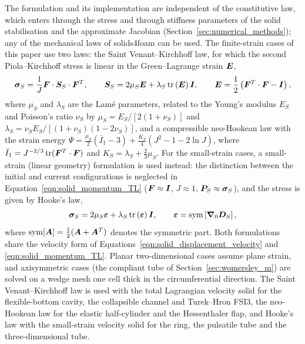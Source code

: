 The formulation and its implementation are independent of the constitutive law, which enters through the stress and through stiffness parameters of the solid stabilisation and the approximate Jacobian (Section~\ref{sec:numerical_methods}); any of the mechanical laws of solids4foam can be used.
The finite-strain cases of this paper use two laws: the Saint Venant--Kirchhoff law, for which the second Piola--Kirchhoff stress is linear in the Green--Lagrange strain $\boldsymbol{E}$,
\begin{equation}
    \boldsymbol{\sigma}_S
    =
    \frac{1}{J}
    \boldsymbol{F} \cdot \boldsymbol{S}_S \cdot \boldsymbol{F}^T,
    \qquad
    \boldsymbol{S}_S
    =
    2 \mu_S \boldsymbol{E}
    +
    \lambda_S \, \text{tr}\left( \boldsymbol{E} \right) \boldsymbol{I},
    \qquad
    \boldsymbol{E}
    =
    \frac{1}{2}
    \left(
    \boldsymbol{F}^T \cdot \boldsymbol{F} - \boldsymbol{I}
    \right),
    \label{eqn:stvk}
\end{equation}
where $\mu_S$ and $\lambda_S$ are the Lam\'e parameters, related to the Young's modulus $E_S$ and Poisson's ratio $\nu_S$ by $\mu_S = E_S / [2(1 + \nu_S)]$ and $\lambda_S = \nu_S E_S / [(1 + \nu_S)(1 - 2\nu_S)]$, and a compressible neo-Hookean law with the strain energy $\Psi = \tfrac{\mu_S}{2}(\bar{I}_1 - 3) + \tfrac{K_S}{4}(J^2 - 1 - 2\ln J)$, where $\bar{I}_1 = J^{-2/3}\,\text{tr}(\boldsymbol{F}^T \cdot \boldsymbol{F})$ and $K_S = \lambda_S + \tfrac{2}{3}\mu_S$.
For the small-strain cases, a small-strain (linear geometry) formulation is used instead: the distinction between the initial and current configurations is neglected in Equation~\eqref{eqn:solid_momentum_TL} ($\boldsymbol{F} \approx \boldsymbol{I}$, $J \approx 1$, $\boldsymbol{P}_S \approx \boldsymbol{\sigma}_S$), and the stress is given by Hooke's law,
\begin{equation}
    \boldsymbol{\sigma}_S
    =
    2 \mu_S \boldsymbol{\varepsilon}
    +
    \lambda_S \, \text{tr}\left( \boldsymbol{\varepsilon} \right) \boldsymbol{I},
    \qquad
    \boldsymbol{\varepsilon}
    =
    \text{sym}
    \left[
    \boldsymbol{\nabla}_0 \boldsymbol{D}_S
    \right],
    \label{eqn:hooke}
\end{equation}
where $\text{sym}[ \boldsymbol{A} ] = \frac{1}{2} (\boldsymbol{A} + \boldsymbol{A}^T)$ denotes the symmetric part.
Both formulations share the velocity form of Equations~\eqref{eqn:solid_displacement_velocity} and \eqref{eqn:solid_momentum_TL}.
Planar two-dimensional cases assume plane strain, and axisymmetric cases (the compliant tube of Section~\ref{sec:womersley_m}) are solved on a wedge mesh one cell thick in the circumferential direction.
The Saint Venant--Kirchhoff law is used with the total Lagrangian velocity solid for the flexible-bottom cavity, the collapsible channel and Turek--Hron FSI3, the neo-Hookean law for the elastic half-cylinder and the Hessenthaler flap, and Hooke's law with the small-strain velocity solid for the ring, the pulsatile tube and the three-dimensional tube.

